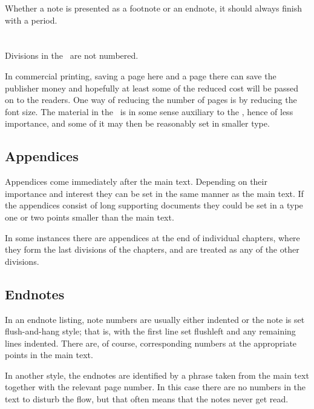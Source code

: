 \documentclass[10pt,letterpaper,extrafontsizes]{memoir}
\begin{document}
Whether a note
is presented as a footnote or an endnote, it should always finish with a
period.


\renewcommand*{\thefootnote}{\arabic{footnote}}

\section{\prBackmatter}

    Divisions in the \pixbackmatter\ are not numbered.

    In commercial printing, saving a page here and a page there can save the
publisher money and hopefully at least some of the reduced cost will be passed
on to the readers. One way of reducing the number of pages is by reducing
the font size. The material in the \pixbackmatter\ is in some sense auxiliary 
to the \pixmainmatter, hence of less importance, and some of it may then be 
reasonably set in smaller type.

\subsection{Appendices}

    Appendices come immediately after the main text. Depending
on their importance and interest they can be set in the same manner as the 
main text. If the appendices consist of long supporting documents they could
be set in a type one or two points smaller than the main text.

    In some instances there are appendices at the end of individual chapters,
where they form the last divisions of the chapters, and are treated as any of
the other divisions.

\subsection{Endnotes}

   In an endnote listing, note numbers are usually 
either indented or the note
is set flush-and-hang style; that is, with the 
first line set flushleft and any remaining lines indented. There are, 
of course, corresponding numbers at the appropriate points in the main text.

   In another style, the endnotes are identified by a phrase taken from the 
main text together with the relevant page number. In this case there
are no numbers in the text to disturb the flow, but that often means that the
notes never get read.
\end{document}
